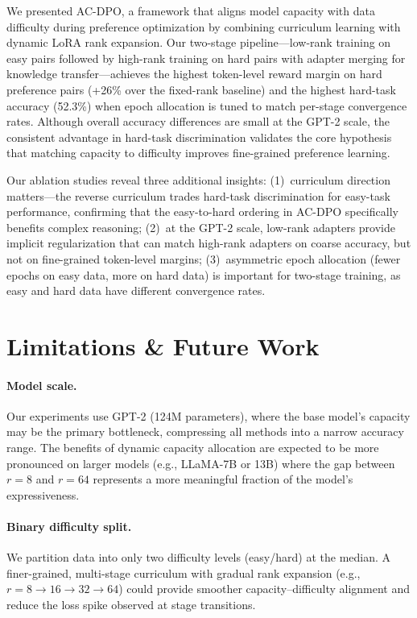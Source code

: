 \documentclass{article}
\begin{document}
We presented AC-DPO, a framework that aligns model capacity with data difficulty during preference optimization by combining curriculum learning with dynamic LoRA rank expansion. Our two-stage pipeline---low-rank training on easy pairs followed by high-rank training on hard pairs with adapter merging for knowledge transfer---achieves the highest token-level reward margin on hard preference pairs (+26\% over the fixed-rank baseline) and the highest hard-task accuracy (52.3\%) when epoch allocation is tuned to match per-stage convergence rates. Although overall accuracy differences are small at the GPT-2 scale, the consistent advantage in hard-task discrimination validates the core hypothesis that matching capacity to difficulty improves fine-grained preference learning.

Our ablation studies reveal three additional insights: (1)~curriculum direction matters---the reverse curriculum trades hard-task discrimination for easy-task performance, confirming that the easy-to-hard ordering in AC-DPO specifically benefits complex reasoning; (2)~at the GPT-2 scale, low-rank adapters provide implicit regularization that can match high-rank adapters on coarse accuracy, but not on fine-grained token-level margins; (3)~asymmetric epoch allocation (fewer epochs on easy data, more on hard data) is important for two-stage training, as easy and hard data have different convergence rates.

\section{Limitations \& Future Work}

\paragraph{Model scale.}
Our experiments use GPT-2 (124M parameters), where the base model's capacity may be the primary bottleneck, compressing all methods into a narrow accuracy range. The benefits of dynamic capacity allocation are expected to be more pronounced on larger models (e.g., LLaMA-7B or 13B) where the gap between $r{=}8$ and $r{=}64$ represents a more meaningful fraction of the model's expressiveness.

\paragraph{Binary difficulty split.}
We partition data into only two difficulty levels (easy/hard) at the median. A finer-grained, multi-stage curriculum with gradual rank expansion (e.g., $r{=}8 \rightarrow 16 \rightarrow 32 \rightarrow 64$) could provide smoother capacity--difficulty alignment and reduce the loss spike observed at stage transitions.
\end{document}
